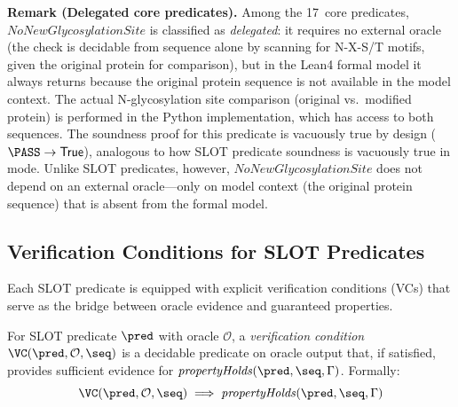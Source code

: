 \noindent\textbf{Remark (Delegated core predicates).}
Among the 17~core predicates, $\mathit{NoNewGlycosylationSite}$ is
classified as \emph{delegated}: it requires no external oracle (the check
is decidable from sequence alone by scanning for N-X-S/T motifs, given
the original protein for comparison), but in the Lean4 formal model it
always returns \PASS{} because the original protein sequence is not
available in the model context. The actual N-glycosylation site comparison
(original vs.\ modified protein) is performed in the Python implementation,
which has access to both sequences. The soundness proof for this predicate
is vacuously true by design ($\PASS \to \mathsf{True}$), analogous to
how SLOT predicate soundness is vacuously true in \CONSERVATIVE{} mode.
Unlike SLOT predicates, however, $\mathit{NoNewGlycosylationSite}$ does
not depend on an external oracle---only on model context (the original
protein sequence) that is absent from the formal model.

\subsection{Verification Conditions for SLOT Predicates}\label{sec:vcs}

Each SLOT predicate is equipped with explicit verification conditions
(VCs) that serve as the bridge between oracle evidence and guaranteed
properties.

\begin{definition}
For SLOT predicate $\pred$ with oracle $\mathcal{O}$, a
\emph{verification condition} $\VC(\pred, \mathcal{O}, \seq)$ is a
decidable predicate on oracle output that, if satisfied, provides
sufficient evidence for $\mathit{propertyHolds}(\pred, \seq, \Gamma)$.
Formally:
\[
  \VC(\pred, \mathcal{O}, \seq) \;\Longrightarrow\;
  \mathit{propertyHolds}(\pred, \seq, \Gamma)
\]
\end{definition}

